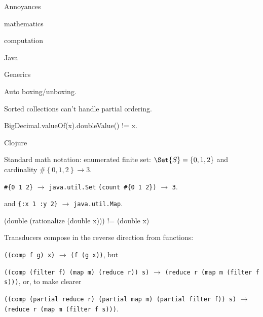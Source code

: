 \begin{plSection}{Annoyances}

\begin{plSection}{mathematics}
\end{plSection}

\begin{plSection}{computation}
\begin{plSection}{Java}
\lstset{language=Java}

Generics

Auto boxing/unboxing.

Sorted collections can't handle partial ordering.

BigDecimal.valueOf(x).doubleValue() != x.

\end{plSection}

\begin{plSection}{Clojure}
\lstset{language=Clojure}

Standard math notation: 
enumerated finite set: $\Set{S} = \left\{0, 1, 2\right\}$ 
and cardinality $\#\left\{0, 1, 2\right\}
\rightarrow 3$.

\lstinline|#{0 1 2}| $\rightarrow$ \lstinline|java.util.Set|
\lstinline|(count #{0 1 2})| $\rightarrow$
\lstinline|3|.

and
\lstinline|{:x 1 :y 2}| $\rightarrow$ \lstinline|java.util.Map|.

(double (rationalize (double x))) != (double x)

Transducers compose in the reverse direction from functions:

\lstinline|((comp f g) x)| $\rightarrow$
\lstinline|(f (g x))|, but

\lstinline|((comp (filter f) (map m) (reduce r)) s)| $\rightarrow$
\lstinline|(reduce r (map m (filter f s)))|, or, to make clearer


\lstinline|((comp (partial reduce r) (partial map m) (partial filter f)) s)| 
$\rightarrow$ \lstinline|(reduce r (map m (filter f s)))|.

\end{plSection}%
\end{plSection}%
\end{plSection}%